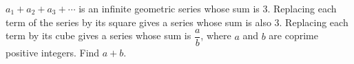 $a_1+a_2+a_3+\cdots$ is an infinite geometric series whose sum is $3$. Replacing each term of the series by its square gives a series whose sum is also $3$. Replacing each term by its cube gives a series whose sum is $\dfrac {a}{b}$, where $a$ and $b$ are coprime positive integers. Find $a+b$.
